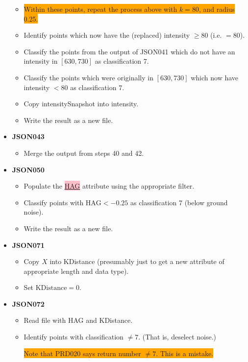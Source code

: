 \documentclass[a4paper,11pt,twoside]{article}
\theoremstyle{definition}
\theoremstyle{remark}
\newcommand{\sh}[1]{\colorbox{pink}{#1}}
\newcommand{\bad}[1]{\colorbox{orange}{#1}}
\begin{document}
\begin{itemize}
\begin{itemize}
\item \bad{Within these points, repeat the process above with $k=80$, and radius 0.25.}
\item Identify points which now have the (replaced) intensity $\geqslant 80$ (i.e. $=80$).
\item Classify the points from the output of JSON041 which do not have an intensity in $[630,730]$ as classification 7. 
\item Classify the points which were originally in $[630,730]$ which now have intensity $<80$ as classification 7.
\item Copy intensitySnapshot into intensity.
\item Write the result as a new file.
\end{itemize}
\item \textbf{JSON043}
\begin{itemize}
\item Merge the output from steps 40 and 42.
\end{itemize}
\item \textbf{JSON050}
\begin{itemize}
\item Populate the \hyperref[smrf]{\sh{HAG}} attribute using the appropriate filter.
\item Classify points with $\mathrm{HAG}<-0.25$ as classification 7 (below ground noise).
\item Write the result as a new file.
\end{itemize}
\item \textbf{JSON071}
\begin{itemize}
\item Copy $X$ into KDistance (presumably just to get a new attribute of appropriate length and data type).
\item Set $\mathrm{KDistance} = 0$.
\end{itemize}
\item \textbf{JSON072}
\begin{itemize}
\item Read file with HAG and KDistance.
\item Identify points with classification $\neq 7$. (That is, deselect noise.) 
\begin{center}
\bad{Note that PRD020 says return number $\neq 7$. This is a mistake.}
\end{center}


\end{itemize}
\end{itemize}
\end{document}

